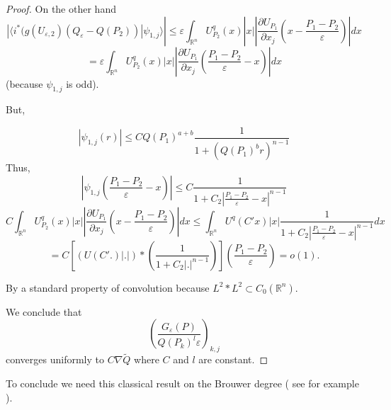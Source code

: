 \documentclass[12pt]{amsart}
\theoremstyle{plain}
\theoremstyle{definition}
\theoremstyle{remark}
\renewcommand{\epsilon}{\varepsilon}
\begin{document}
\begin{proof}
On the other hand
$$|\langle i^*(g(U_{\epsilon,2})(Q_{\epsilon}-Q(P_2))|\psi_{1,j}\rangle|\leq \epsilon \int_{\mathbb{R}^n}U^q_{P_2}(x)|x|\left|\frac{\partial U_{P_1}}{\partial x_j}\left(x-\frac{P_1-P_2}{\epsilon}\right)\right|dx $$
$$=\epsilon \int_{\mathbb{R}^n}U^q_{P_2}(x)|x|\left|\frac{\partial U_{P_1}}{\partial x_j}\left(\frac{P_1-P_2}{\epsilon}-x\right)\right|dx$$
(because $\psi_{1,j}$ is odd).

But,

$$|\psi_{1,j}(r)| \leq C Q(P_1)^{a+b}\frac{1}{1+(Q(P_1)^br)^{n-1}} $$
Thus, 
$$\left|\psi_{1,j}\left(\frac{P_1-P_2}{\epsilon}-x\right)\right| \leq C \frac{1}{1+C_2|\frac{P_1-P_2}{\epsilon}-x|^{n-1}} $$
$$C\int_{\mathbb{R}^n}U^q_{P_2}(x)|x|\left|\frac{\partial U_{P_1}}{\partial x_j}\left(x-\frac{P_1-P_2}{\epsilon}\right)\right|dx \leq \int_{\mathbb{R}^n}U^q(C'x)|x| \frac{1}{1+C_2|\frac{P_1-P_2}{\epsilon}-x|^{{n-1}}} dx $$
$$= C\left[(U(C'.)|.|)*(\frac{1}{1+C_2|.|^{n-1}})\right]\left(\frac{P_1-P_2}{\epsilon}\right)=o(1).$$

By a standard property of convolution because $L^2*L^2 \subset C_{0}(\mathbb{R}^n)$.






We conclude that $$\left(\frac{G_{\epsilon}(P)}{Q(P_k)^l\epsilon}\right)_{k,j}$$ converges uniformly to $C\nabla \tilde{Q}$  where $C$ and $l$ are constant.


\end{proof} 


To conclude we need this classical result on the Brouwer degree ( see for example \cite{AmbrosettiMalchiodi2007}). 
\end{document}
